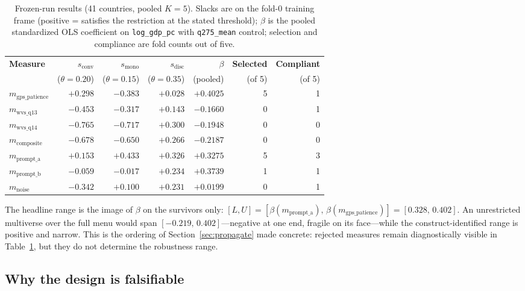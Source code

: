 \documentclass[10pt,letterpaper]{article}
\begin{document}
\begin{table}[t]
\centering
\small
\caption{Frozen-run results (41 countries, pooled $K{=}5$).
Slacks are on the fold-0 training frame (positive = satisfies the restriction at the stated threshold); $\beta$ is the pooled standardized OLS coefficient on \texttt{log\_gdp\_pc} with \texttt{q275\_mean} control; selection and compliance are fold counts out of five.}
\label{tab:results}
\begin{tabularx}{\textwidth}{@{}>{\raggedright\arraybackslash}p{2.6cm} rrrrrr@{}}
\toprule
\textbf{Measure} & $s_{\mathrm{conv}}$ & $s_{\mathrm{mono}}$ & $s_{\mathrm{disc}}$ & $\beta$ & \textbf{Selected} & \textbf{Compliant} \\
\cmidrule(lr){2-4}\cmidrule(lr){5-5}\cmidrule(lr){6-7}
 & ($\theta{=}0.20$) & ($\theta{=}0.15$) & ($\theta{=}0.35$) & (pooled) & (of 5) & (of 5) \\
\midrule
$m_{\mathrm{gps\_patience}}$        & $+0.298$ & $-0.383$ & $+0.028$ & $+0.4025$ & 5 & 1 \\
$m_{\mathrm{wvs\_q13}}$        & $-0.453$ & $-0.317$ & $+0.143$ & $-0.1660$ & 0 & 1 \\
$m_{\mathrm{wvs\_q14}}$        & $-0.765$ & $-0.717$ & $+0.300$ & $-0.1948$ & 0 & 0 \\
$m_{\mathrm{composite}}$       & $-0.678$ & $-0.650$ & $+0.266$ & $-0.2187$ & 0 & 0 \\
$m_{\mathrm{prompt\_a}}$  & $+0.153$ & $+0.433$ & $+0.326$ & $+0.3275$ & 5 & 3 \\
$m_{\mathrm{prompt\_b}}$  & $-0.059$ & $-0.017$ & $+0.234$ & $+0.3739$ & 1 & 1 \\
$m_{\mathrm{noise}}$      & $-0.342$ & $+0.100$ & $+0.231$ & $+0.0199$ & 0 & 1 \\
\bottomrule
\end{tabularx}
\end{table}

The headline range is the image of $\beta$ on the survivors only: $[L,U]=[\beta(m_{\mathrm{prompt\_a}}),\,\beta(m_{\mathrm{gps\_patience}})]=[0.328,\,0.402]$.
An unrestricted multiverse over the full menu would span $[-0.219,\,0.402]$---negative at one end, fragile on its face---while the construct-identified range is positive and narrow.
This is the ordering of Section~\ref{sec:propagate} made concrete: rejected measures remain diagnostically visible in Table~\ref{tab:results}, but they do not determine the robustness range.

\subsection{Why the design is falsifiable}
\label{sec:app-falsifiable}
\end{document}
